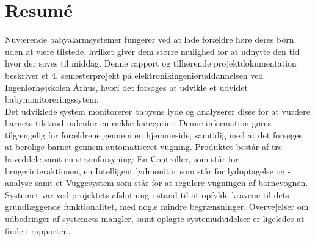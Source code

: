 \chapter{Resumé}

Nuværende babyalarmsystemer fungerer ved at lade forældre høre deres børn uden at være tilstede, hvilket giver dem større mulighed for at udnytte den tid hvor der soves til middag.
Denne rapport og tilhørende projektdokumentation beskriver et 4. semesterprojekt på elektronikingeniøruddannelsen ved Ingeniørhøjskolen Århus, hvori det forsøges at udvikle et udvidet babymonitoreringssytem.\\
Det udviklede system monitorerer babyens lyde og analyserer disse for at vurdere barnets tilstand indenfor en række kategorier. Denne information gøres tilgængelig for forældrene gennem en hjemmeside, samtidig med at det forsøges at berolige barnet gennem automatiseret vugning.
Produktet består af tre hoveddele samt en strømforsyning: En Controller, som står for brugerinteraktionen, en Intelligent lydmonitor som står for lydoptagelse og -analyse samt et Vuggesystem som står for at regulere vugningen af barnevognen. \\
Systemet var ved projektets afslutning i stand til at opfylde kravene til dets grundlæggende funktionalitet, med nogle mindre begrænsninger. Overvejelser om udbedringer af systemets mangler, samt oplagte systemudvidelser er ligeledes at finde i rapporten.\\